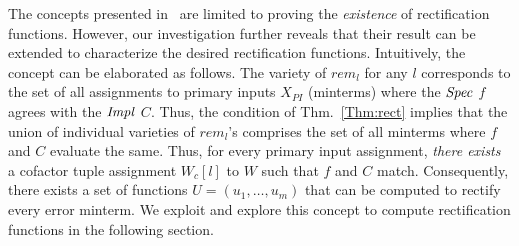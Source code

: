 The concepts presented in~\cite{Vkrao:ISQED21} are limited to
proving the {\it existence} of rectification functions.
However, our investigation further reveals that their result
can be extended to characterize the desired rectification functions.
Intuitively, the concept can be elaborated as follows.
The variety of $rem_l$ for any $l$ corresponds to the set of
all assignments to primary inputs $X_{PI}$ (minterms) where the
${\it Spec}$ $f$ agrees with the ${\it Impl}$ $C$. Thus, the
condition of Thm.~\ref{Thm:rect} implies that the union of individual
varieties of $rem_l$'s comprises the set of all minterms where $f$ and $C$ evaluate the same. 
Thus, for every primary input assignment, {\it there exists} a cofactor tuple
assignment $W_c[l]$ to $W$ such that $f$ and $C$ match. Consequently, there
exists a set of functions $U = (u_1,\dots,u_m)$ that can be computed to 
rectify every error minterm. We exploit and explore this concept 
to compute rectification functions in the following section.



